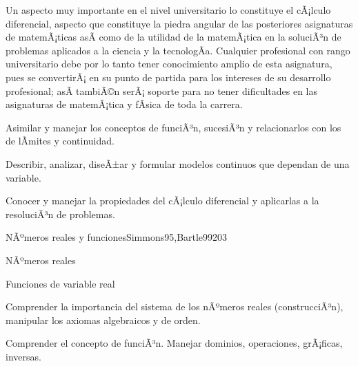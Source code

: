 \begin{syllabus}


\begin{justification}
Un aspecto muy importante en el nivel universitario lo constituye el cÃ¡lculo diferencial,  aspecto que constituye la piedra angular de las posteriores asignaturas de matemÃ¡ticas asÃ­ como de la utilidad de la matemÃ¡tica en la soluciÃ³n de problemas aplicados a la ciencia y la tecnologÃ­a. Cualquier profesional con rango universitario debe por lo tanto tener conocimiento amplio de esta asignatura, pues se convertirÃ¡ en su punto de partida para los intereses de su desarrollo profesional; asÃ­ tambiÃ©n serÃ¡ soporte para no tener dificultades en las asignaturas de matemÃ¡tica y fÃ­sica de toda la carrera.
\end{justification}

\begin{goals}
\item Asimilar y manejar los conceptos de funciÃ³n, sucesiÃ³n y relacionarlos con los de lÃ­mites y continuidad.
\item Describir, analizar, diseÃ±ar y formular modelos continuos que dependan de una variable.
\item Conocer y manejar la propiedades del cÃ¡lculo diferencial y aplicarlas a la resoluciÃ³n de problemas.
\end{goals}

\begin{outcomes}
\end{outcomes}

\begin{unit}{NÃºmeros reales y funciones}{Simmons95,Bartle99}{20}{3}
   \begin{topics}
      \item NÃºmeros reales
      \item Funciones de variable real
   \end{topics}

   \begin{learningoutcomes}
      \item Comprender la importancia del sistema de los nÃºmeros reales (construcciÃ³n), manipular los axiomas algebraicos y de orden.
      \item Comprender el concepto de funciÃ³n. Manejar dominios, operaciones, grÃ¡ficas, inversas.
      \end{learningoutcomes}
\end{unit}


\end{syllabus}
